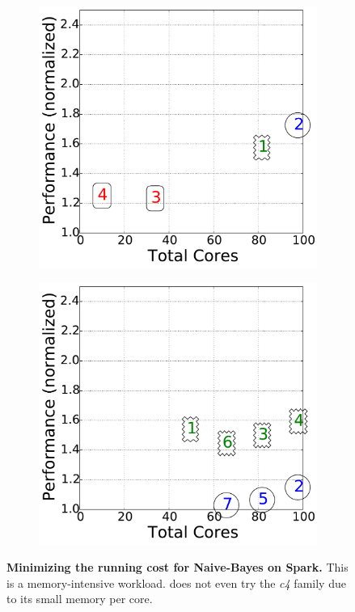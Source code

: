\begin{figure}[!htbp]
\centering
\begin{subfigure}[b]{0.4\textwidth}
    \includegraphics[width=\linewidth]{figures/multiple_bo_cost_spark1.5.naive-bayes.huge_12_cores.pdf}
    \caption{\cherrypick}
    \label{fig:comparison_cost_cherrypick}
\end{subfigure}
\begin{subfigure}[b]{0.4\textwidth}
    \includegraphics[width=\linewidth]{figures/multiple_scout_cost_spark1.5.naive-bayes.huge_24_m4.large_cores.pdf}
    \caption{\scout}
    \label{fig:comparison_cost_scout}
\end{subfigure}
\caption{\small{\textbf{Minimizing the running cost for Naive-Bayes on Spark.} This is a memory-intensive workload.  \scout does not even try the \emph{c4} family due to its small memory per core.}}
\label{fig:compare_4}
\end{figure}



